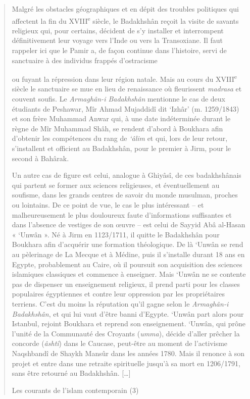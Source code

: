 \begin{quote}
Malgré les obstacles géographiques et en dépit des troubles politiques
qui affectent la fin du XVIII\textsuperscript{e} siècle, le Badakhshân
reçoit la visite de savants religieux qui, pour certains, décident de
s'y installer et interrompent définitivement leur voyage vers l'Inde ou
vers la Transoxiane. Il faut rappeler ici que le Pamir a, de façon
continue dans l'histoire, servi de sanctuaire à des individus frappés
d'ostracisme

ou fuyant la répression dans leur région natale. Mais au cours du
XVIII\textsuperscript{e} siècle le sanctuaire se mue en lieu de
renaissance où fleurissent \emph{madrasa} et couvent soufis. Le
\emph{Armaghân-i Badakhshân} mentionne le cas de deux étudiants de
Peshawar, Mîr Ahmad Mujaddidî dit `Izhâr' (m. 1259/1843) et son frère
Muhammad Anwar qui, à une date indéterminée durant le règne de Mîr
Muhammad Shâh, se rendent d'abord à Boukhara afin d'obtenir les
compétences du rang de \emph{`âlim} et qui, lors de leur retour,
s'installent et officient au Badakhshân, pour le premier à Jirm, pour le
second à Bahârak.

Un autre cas de figure est celui, analogue à Ghiyâsî, de ces
badakhshânais qui partent se former aux sciences religieuses, et
éventuellement au soufisme, dans les grands centres de savoir du monde
musulman, proches ou lointains. De ce point de vue, le cas le plus
intéressant -- et malheureusement le plus douloureux faute
d'informations suffisantes et dans l'absence de vestiges de son œuvre --
est celui de Sayyid Abâ al-Hasan « `Unwân ». Né à Jirm en 1123/1711, il
quitte le Badakhshân pour Boukhara afin d'acquérir une formation
théologique. De là `Unwân se rend au pèlerinage de La Mecque et à
Médine, puis il s'installe durant 18 ans en Egypte, probablement au
Caire, où il poursuit son acquisition des sciences islamiques classiques
et commence à enseigner. Mais `Unwân ne se contente pas de dispenser un
enseignement religieux, il prend parti pour les classes populaires
égyptiennes et contre leur oppression par les propriétaires terriens.
C'est du moins la réputation qu'il gagne selon le \emph{Armaghân-i
Badakhshân}, et qui lui vaut d'être banni d'Egypte. `Unwân part alors
pour Istanbul, rejoint Boukhara et reprend son enseignement. `Unwân, qui
prône l'unité de la Communauté des Croyants (\emph{umma}), décide
d'aller prêcher la concorde (\emph{âshtî}) dans le Caucase, peut-être au
moment de l'activisme Naqshbandî de Shaykh Mansûr dans les années 1780.
Mais il renonce à son projet et entre dans une retraite spirituelle
jusqu'à sa mort en 1206/1791, sans être retourné au Badakhshân.
{[}\ldots{]}

Les courants de l'islam contemporain (3)
\end{quote}

